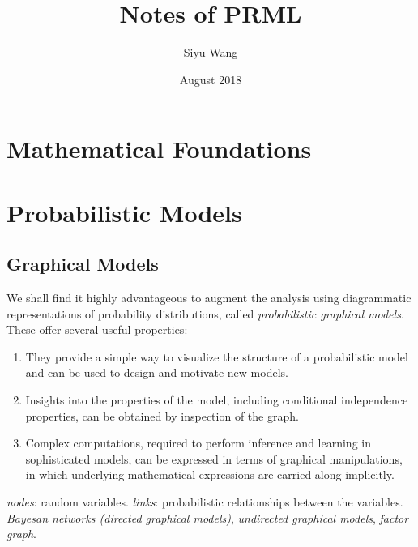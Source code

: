 \documentclass[a4paper]{book}
\title{Notes of PRML}
\author{Siyu Wang}
\date{August 2018}
\begin{document}
\maketitle
\chapter{Mathematical Foundations}

\chapter{Probabilistic Models}
\section{Graphical Models}
We shall find it highly advantageous to augment the analysis using diagrammatic representations of probability distributions, called \textit{probabilistic graphical models}. These offer several useful properties:
\begin{enumerate}
    \item They provide a simple way to visualize the structure of a probabilistic model and can be used to design and motivate new models.
    \item Insights into the properties of the model, including conditional independence properties, can be obtained by inspection of the graph.
    \item Complex computations, required to perform inference and learning in sophisticated models, can be expressed in terms of graphical manipulations, in which underlying mathematical expressions are carried along implicitly.
\end{enumerate}
\textit{nodes}: random variables. \textit{links}: probabilistic relationships between the variables.
\newline
\textit{Bayesan networks (directed graphical models)}, \textit{undirected graphical models}, \textit{factor graph}.
\end{document}

